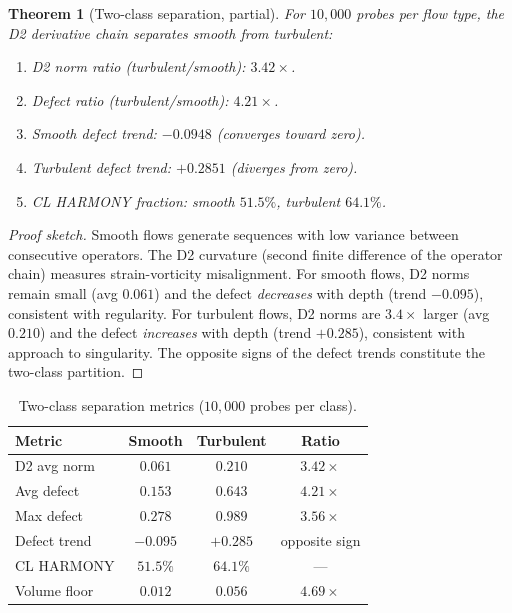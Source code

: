 \documentclass[11pt]{article}
\newtheorem{theorem}{Theorem}[section]
\theoremstyle{definition}
\theoremstyle{remark}
\begin{document}
\begin{theorem}[Two-class separation, partial]
\label{thm:two-class}
For $10{,}000$ probes per flow type, the D2 derivative chain separates smooth
from turbulent:
\begin{enumerate}
  \item D2 norm ratio (turbulent/smooth): $3.42\times$.
  \item Defect ratio (turbulent/smooth): $4.21\times$.
  \item Smooth defect trend: $-0.0948$ (converges toward zero).
  \item Turbulent defect trend: $+0.2851$ (diverges from zero).
  \item CL HARMONY fraction: smooth $51.5\%$, turbulent $64.1\%$.
\end{enumerate}
\end{theorem}

\begin{proof}[Proof sketch]
Smooth flows generate sequences with low variance between consecutive
operators.  The D2 curvature (second finite difference of the operator chain)
measures strain-vorticity misalignment.  For smooth flows, D2 norms remain
small (avg $0.061$) and the defect \emph{decreases} with depth (trend
$-0.095$), consistent with regularity.  For turbulent flows, D2 norms are
$3.4\times$ larger (avg $0.210$) and the defect \emph{increases} with depth
(trend $+0.285$), consistent with approach to singularity.  The opposite signs
of the defect trends constitute the two-class partition.
\end{proof}

\begin{table}[ht]
\centering
\caption{Two-class separation metrics ($10{,}000$ probes per class).}
\label{tab:two-class}
\begin{tabular}{lccc}
\toprule
\textbf{Metric} & \textbf{Smooth} & \textbf{Turbulent} & \textbf{Ratio} \\
\midrule
D2 avg norm    & $0.061$ & $0.210$ & $3.42\times$ \\
Avg defect     & $0.153$ & $0.643$ & $4.21\times$ \\
Max defect     & $0.278$ & $0.989$ & $3.56\times$ \\
Defect trend   & $-0.095$ & $+0.285$ & opposite sign \\
CL HARMONY     & $51.5\%$ & $64.1\%$ & --- \\
Volume floor   & $0.012$ & $0.056$ & $4.69\times$ \\
\bottomrule
\end{tabular}
\end{table}
\end{document}
